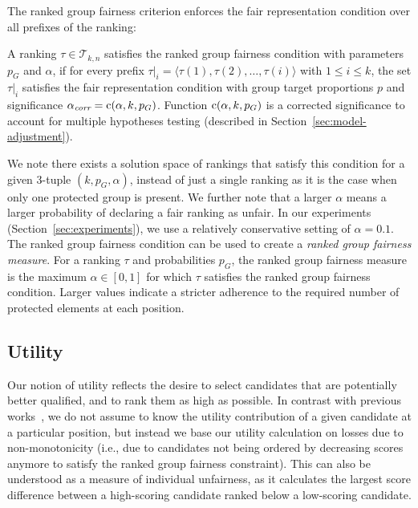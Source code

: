 The ranked group fairness criterion enforces the fair representation condition over all prefixes of the ranking:

\begin{definition}
	\label{def:ranked-group-fairness-condition}
	A ranking $\tau \in {\mathcal T}_{k,n}$ satisfies the ranked group fairness condition with parameters $p_G$ and $\alpha$, if for every prefix $\tau|_i = \langle \tau(1), \tau(2), \dots, \tau(i) \rangle$ with $1 \le i \le k$, the set $\tau|_i$ satisfies the fair representation condition with group target proportions $p$ and significance $\alpha_\textit{corr} = \operatorname{c}(\alpha, k, p_G)$.
	Function $\operatorname{c}(\alpha, k, p_G)$ is a corrected significance to account for multiple hypotheses testing (described in Section~\ref{sec:model-adjustment}).
\end{definition}

We note \textcolor[rgb]{0.00,0.00,1.00}{there exists} a solution space of rankings that satisfy this condition for a given 3-tuple $(k, p_G, \alpha)$, instead of just a single ranking as it is the case when only one protected group is present.
We further note that a larger $\alpha$ means a larger probability of declaring a fair ranking as unfair.
%
In our experiments (Section~\ref{sec:experiments}), we use a relatively conservative setting of $\alpha=0.1$.
%
The ranked group fairness condition can be used to create a \emph{ranked group fairness measure}. For a ranking $\tau$ and probabilities $p_G$, the ranked group fairness measure is the maximum $\alpha \in [0,1]$ for which $\tau$ satisfies the ranked group fairness condition.
%
Larger values indicate a stricter adherence to the required number of protected elements at each position.

\subsection{Utility}
\label{subsec:individual-fairness}
Our notion of utility reflects the desire to select candidates that are potentially better qualified, and to rank them as high as possible.
%
In contrast with previous works~\cite{yang2016measuring,celis2017ranking}, we do not assume to know the utility contribution of a given candidate at a particular position, but instead we base our utility calculation on losses due to non-monotonicity (i.e., due to candidates not being ordered by decreasing scores anymore to satisfy the ranked group fairness constraint).
%
This can also be understood as a measure of individual unfairness, as it calculates the largest score difference between a high-scoring candidate ranked below a low-scoring candidate.

